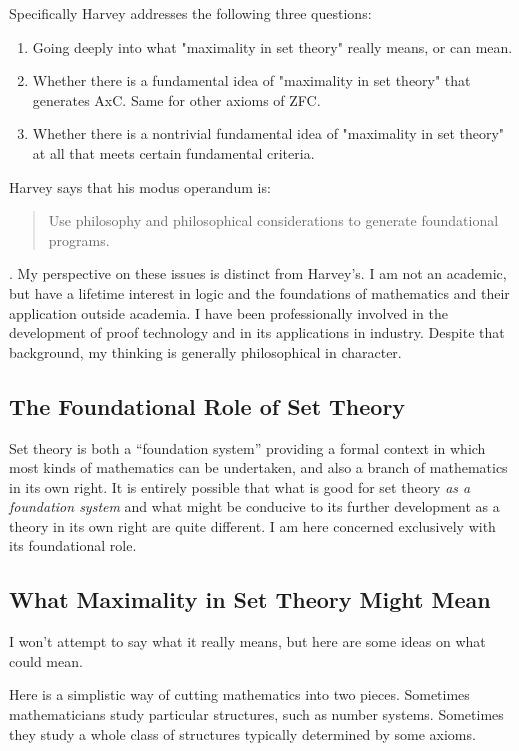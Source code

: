 \documentclass[10pt,titlepage]{article}
\begin{document}
Specifically Harvey addresses the following three questions:

\begin{enumerate}
\item Going deeply into what "maximality in set theory" really means, or can mean.
\item Whether there is a fundamental idea of "maximality in set theory"
that generates AxC. Same for other axioms of ZFC.
\item Whether there is a nontrivial fundamental idea of "maximality in
set theory" at all that meets certain fundamental criteria.
\end{enumerate}

Harvey says that his modus operandum is:

\begin{quote}
Use philosophy and philosophical considerations to generate foundational programs.
\end{quote}
.
My perspective on these issues is distinct from Harvey's.
I am not an academic, but have a lifetime interest in logic and the foundations
of mathematics and their application outside academia.
I have been professionally involved in the development of proof technology and in its
applications in industry.
Despite that background, my thinking is generally philosophical in character.

\subsection{The Foundational Role of Set Theory}

Set theory is both a ``foundation system'' providing a formal context in which most kinds of mathematics can be undertaken, and also a branch of mathematics in its own right.
It is entirely possible that what is good for set theory \emph{as a foundation system} and what might be conducive to its further development as a theory in its own right are quite different.
I am here concerned exclusively with its foundational role.

\subsection{What Maximality in Set Theory Might Mean}

I won't attempt to say what it really means, but here are some ideas on what could mean.

Here is a simplistic way of cutting mathematics into two pieces.
Sometimes mathematicians study particular structures, such as number systems.
Sometimes they study a whole class of structures typically determined by some axioms.
\end{document}
